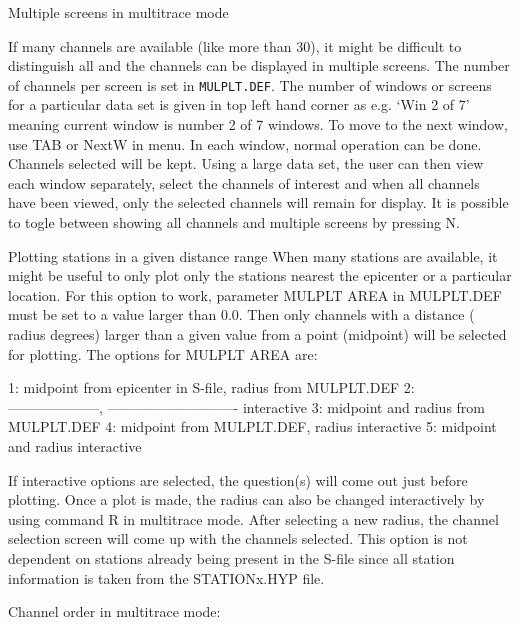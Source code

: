 Multiple screens in multitrace mode 

If many channels are available (like more than 30), it might be difficult to distinguish all and the channels can be displayed in multiple screens. The number of channels per screen is set in \texttt{MULPLT.DEF}. The number of windows or screens for a particular data set is given in top left hand corner as e.g. `Win 2 of 7' meaning current window is number 2 of 7 windows. To move to the next window, use TAB or NextW in menu. In each window, normal operation can be done. Channels selected will be kept. Using a large data set, the user can then view each window separately, select the channels of interest and when all channels have been viewed, only the selected channels will remain for display.
It is possible to togle between showing all channels and multiple screens by pressing N.  


Plotting stations in a given distance range
When many stations are available, it might be useful to only plot only the stations nearest the epicenter or a particular location. For this option to work, parameter MULPLT AREA in  MULPLT.DEF must be set to a value larger than 0.0.  Then only channels with a distance ( radius degrees) larger than a given value from a point (midpoint) will be selected for plotting. The options for MULPLT AREA are:

1: midpoint from epicenter in S-file, radius from MULPLT.DEF
2: --------------------, ---------------------------- interactive
3: midpoint and radius from MULPLT.DEF
4: midpoint from MULPLT.DEF, radius interactive
5: midpoint and radius interactive

If interactive options are selected, the question(s) will come out just before plotting. Once a plot is made, the radius can also be changed interactively by using command R in multitrace mode. After selecting a new radius, the channel selection screen will come up with the channels selected. This option is not dependent on stations already being present in the S-file since all station information is taken from the STATIONx.HYP file.



Channel order in multitrace mode: 

